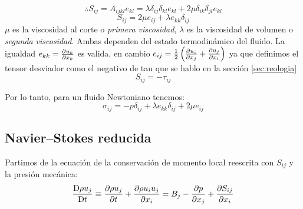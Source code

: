 $$\therefore S_{ij}= A_{ijkl}e_{kl}=\lambda\delta_{ij}\delta_{kl}e_{kl} +2\mu\delta_{ik}\delta_{jl}e_{kl}$$
\begin{equation}
    S_{ij}=2\mu e_{ij}+\lambda e_{kk} \delta_{ij}
\end{equation}
$\mu$ es la viscosidad al corte o \emph{primera viscosidad}, $\lambda$ es la viscosidad de volumen o \emph{segunda viscosidad}. Ambas dependen del estado termodinámico del fluido. La igualdad $e_{kk}=\frac{\partial u_k}{\partial x_k}$ es valida, en cambio $e_{ij}=\frac{1}{2}\left(\frac{\partial u_i}{\partial x_j}+\frac{\partial u_j}{\partial x_i}\right)$ ya que definimos el tensor desviador como el negativo de tau que se hablo en la sección \ref{sec:reologia}
\[
S_{ij}=-\tau_{ij}
\]

Por lo tanto, para un fluido Newtoniano tenemos:
\begin{equation}\label{eq:sigmanewt}
\sigma_{ij}=-p\delta_{ij}+\lambda e_{kk}\delta_{ij}+2\mu e_{ij} 
\end{equation}







\subsection{Navier--Stokes reducida}
Partimos de la ecuación de la conservación de momento local reescrita con $S_{ij}$ y la presión mecánica:
\begin{equation} \label{eq:NewtonSij}
    \frac{\textrm{D} \rho u_j}{\textrm{D} t}\equiv   \frac{\partial \rho u_j}{\partial t}+\frac{\partial \rho u_i u_j}{\partial x_i}=B_j-\frac{\partial p}{\partial x_j}+\frac{\partial S_{ij}}{\partial x_i}
\end{equation}

